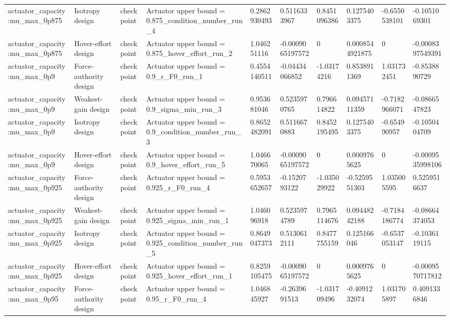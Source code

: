 \begin{tabular}{@{}llllllllll@{}}
actuator\_capacity:mu\_max\_0p875 & Isotropy design & checkpoint & Actuator upper bound = 0.875\_condition\_number\_run\_4 & 0.2862930493 & 0.5116333967 & 0.8451096386 & 0.1275403375 & -0.6550538101 & -0.1051069301 \\
actuator\_capacity:mu\_max\_0p875 & Hover-effort design & checkpoint & Actuator upper bound = 0.875\_hover\_effort\_run\_2 & 1.046251116 & -0.0009065197572 & 0 & 0.0008544921875 & 0 & -0.0008397549391 \\
actuator\_capacity:mu\_max\_0p9 & Force-authority design & checkpoint & Actuator upper bound = 0.9\_r\_F0\_run\_1 & 0.4554140511 & -0.04434066852 & -1.03174216 & 0.8538911369 & 1.031732451 & -0.8538890729 \\
actuator\_capacity:mu\_max\_0p9 & Weakest-gain design & checkpoint & Actuator upper bound = 0.9\_sigma\_min\_run\_3 & 0.953681046 & 0.5235970765 & 0.796614822 & 0.09457111359 & -0.7182966071 & -0.0866547823 \\
actuator\_capacity:mu\_max\_0p9 & Isotropy design & checkpoint & Actuator upper bound = 0.9\_condition\_number\_run\_3 & 0.8652482091 & 0.5116670883 & 0.8452195495 & 0.1275403375 & -0.654990957 & -0.1050404709 \\
actuator\_capacity:mu\_max\_0p9 & Hover-effort design & checkpoint & Actuator upper bound = 0.9\_hover\_effort\_run\_5 & 1.046670065 & -0.0009065197572 & 0 & 0.0009765625 & 0 & -0.0009535998106 \\
actuator\_capacity:mu\_max\_0p925 & Force-authority design & checkpoint & Actuator upper bound = 0.925\_r\_F0\_run\_4 & 0.5953652657 & -0.1520793122 & -1.035029922 & -0.5259551303 & 1.035005595 & 0.5259516637 \\
actuator\_capacity:mu\_max\_0p925 & Weakest-gain design & checkpoint & Actuator upper bound = 0.925\_sigma\_min\_run\_1 & 1.046096918 & 0.5235974789 & 0.7965114676 & 0.09448242188 & -0.7184186774 & -0.08664374053 \\
actuator\_capacity:mu\_max\_0p925 & Isotropy design & checkpoint & Actuator upper bound = 0.925\_condition\_number\_run\_5 & 0.8649047373 & 0.5130612111 & 0.8477755159 & 0.125166046 & -0.6537053147 & -0.1036119115 \\
actuator\_capacity:mu\_max\_0p925 & Hover-effort design & checkpoint & Actuator upper bound = 0.925\_hover\_effort\_run\_1 & 0.8259105475 & -0.0009065197572 & 0 & 0.0009765625 & 0 & -0.0009570717812 \\
actuator\_capacity:mu\_max\_0p95 & Force-authority design & checkpoint & Actuator upper bound = 0.95\_r\_F0\_run\_4 & 1.046845927 & -0.2639691513 & -1.031709496 & -0.4091232074 & 1.031705897 & 0.4091336846 \\

\end{tabular}
